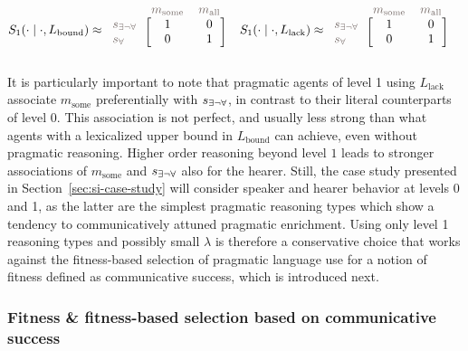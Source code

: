 \documentclass[a4paper, 11pt]{article}
\theoremstyle{Satz}
\newcommand{\state}{\ensuremath{s}\xspace}		%
\newcommand{\mystate}[1]{\ensuremath{\state_{\text{#1}}}\xspace} %
\newcommand{\mylang}[1]{\ensuremath{L_{\text{#1}}}\xspace} %
\newcommand{\messg}{\ensuremath{m}\xspace}		%
\newcommand{\mymessg}[1]{\ensuremath{\messg_{\text{#1}}}\xspace} %
\newcommand{\ssome}{\mystate{\ensuremath{\exists\neg\forall}}}
\newcommand{\sall}{\mystate{\ensuremath{\forall}}}
\newcommand{\msome}{\mymessg{some}}
\newcommand{\mall}{\mymessg{all}}
\newcommand{\Lbound}{\mylang{bound}}
\newcommand{\Llack}{\mylang{lack}}
\newcommand{\mygray}[1]{{\textcolor{mygray}{#1}}}
\begin{document}
\begin{align*}
  S_1(\cdot \mid \cdot, \Lbound) & \approx \begin{blockarray}{lcc}
    & \mygray{\msome} & \mygray{\mall} \\
    \begin{block}{l[cc]}
      \mygray{\ssome} & 1 & 0 \\
      \mygray{\sall}  & 0 & 1 \\
    \end{block}
  \end{blockarray} &
  S_1(\cdot \mid \cdot, \Llack) & \approx \begin{blockarray}{lcc}
    & \mygray{\msome} & \mygray{\mall} \\
    \begin{block}{l[cc]}
      \mygray{\ssome} & 1 & 0 \\
      \mygray{\sall}  & 0 & 1 \\
    \end{block}
  \end{blockarray} 
\end{align*}







It is particularly important to note that pragmatic agents of level 1 using $\Llack$ associate
$\msome$ preferentially with $\ssome$, in contrast to their literal counterparts of level
0. This association is not perfect, and usually less strong than what agents with a lexicalized
upper bound in $\Lbound$ can achieve, even without pragmatic reasoning. Higher order reasoning
beyond level $1$ leads to stronger associations of $\msome$ and $\ssome$ also for the
hearer. Still, the case study presented in Section~\ref{sec:si-case-study} will consider
speaker and hearer behavior at levels 0 and 1, as the latter are the simplest pragmatic
reasoning types which show a tendency to communicatively attuned pragmatic enrichment. Using
only level 1 reasoning types and possibly small $\lambda$ is therefore a conservative choice
that works against the fitness-based selection of pragmatic language use for a notion of
fitness defined as communicative success, which is introduced next.

\subsubsection{Fitness \& fitness-based selection based on communicative success}\label{sec:expressivity}
\end{document}
